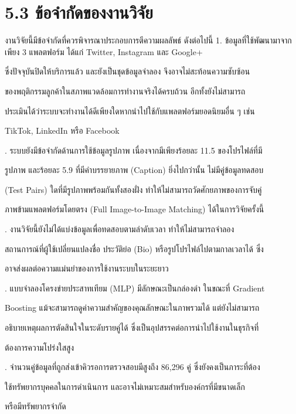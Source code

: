 \documentclass[12pt,a4paper]{report}
\begin{document}
\section*{5.3 ข้อจำกัดของงานวิจัย}
งานวิจัยนี้มีข้อจำกัดที่ควรพิจารณาประกอบการตีความผลลัพธ์ ดังต่อไปนี้ 1. ข้อมูลที่ใช้พัฒนามาจากเพียง 3 แพลตฟอร์ม ได้แก่ Twitter, Instagram และ Google+\par
ซึ่งปัจจุบันปิดให้บริการแล้ว และยังเป็นชุดข้อมูลจำลอง จึงอาจไม่สะท้อนความซับซ้อน\par
ของพฤติกรรมลูกค้าในสภาพแวดล้อมการทำงานจริงได้ครบถ้วน อีกทั้งยังไม่สามารถ\par
ประเมินได้ว่าระบบจะทำงานได้ดีเพียงใดหากนำไปใช้กับแพลตฟอร์มยอดนิยมอื่น ๆ เช่น\par
TikTok, LinkedIn หรือ Facebook\par
{}. ระบบยังมีข้อจำกัดด้านการใช้ข้อมูลรูปภาพ เนื่องจากมีเพียงร้อยละ 11.5 ของโปรไฟล์ที่มี\par
รูปภาพ และร้อยละ 5.9 ที่มีคำบรรยายภาพ (Caption) ยิ่งไปกว่านั้น ไม่มีคู่ข้อมูลทดสอบ\par
(Test Pairs) ใดที่มีรูปภาพพร้อมกันทั้งสองฝั่ง ทำให้ไม่สามารถวัดศักยภาพของการจับคู่\par
ภาพข้ามแพลตฟอร์มโดยตรง (Full Image-to-Image Matching) ได้ในการวิจัยครั้งนี้\par
{}. งานวิจัยนี้ยังไม่ได้แบ่งข้อมูลเพื่อทดสอบตามลำดับเวลา ทำให้ไม่สามารถจำลอง\par
สถานการณ์ที่ผู้ใช้เปลี่ยนแปลงชื่อ ประวัติย่อ (Bio) หรือรูปโปรไฟล์ไปตามกาลเวลาได้ ซึ่ง\par
อาจส่งผลต่อความแม่นยำของการใช้งานระบบในระยะยาว\par
{}. แบบจำลองโครงข่ายประสาทเทียม (MLP) มีลักษณะเป็นกล่องดำ ในขณะที่ Gradient\par
Boosting แม้จะสามารถดูค่าความสำคัญของคุณลักษณะในภาพรวมได้ แต่ยังไม่สามารถ\par
อธิบายเหตุผลการตัดสินใจในระดับรายคู่ได้ ซึ่งเป็นอุปสรรคต่อการนำไปใช้งานในธุรกิจที่\par
ต้องการความโปร่งใสสูง\par
{}. จำนวนคู่ข้อมูลที่ถูกส่งเข้าคิวรอการตรวจสอบมีสูงถึง 86,296 คู่ ซึ่งยังคงเป็นภาระที่ต้อง\par
ใช้ทรัพยากรบุคคลในการดำเนินการ และอาจไม่เหมาะสมสำหรับองค์กรที่มีขนาดเล็ก\par
หรือมีทรัพยากรจำกัด\par
\clearpage
\end{document}

